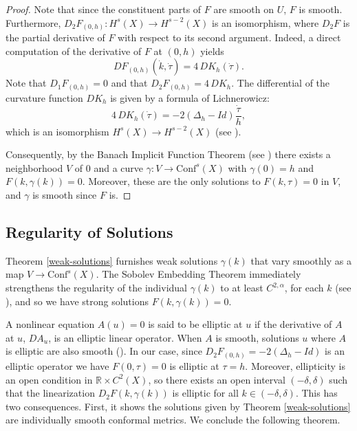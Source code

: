 \documentclass{amsart}
\newcommand{\R}{\mathbb{R}}
\begin{document}
\begin{proof} 
Note that since the constituent parts of $F$ are smooth on $U$, $F$ is smooth. 
Furthermore, $D_2F_{(0,h)} : H^s(X) \to H^{s-2}(X)$ is an isomorphism, where $D_2F$ is the partial derivative of $F$ with respect to its second argument. 
Indeed, a direct computation of the derivative of $F$ at $(0,h)$ yields 
\[
DF_{(0,h)}(\dot{k},\dot{\tau}) = 4 \, D K_h(\dot{\tau}).
\]
Note that $D_1F_{(0,h)} = 0$ and that $D_2F_{(0,h)} = 4 \, DK_h$. 
The differential of the curvature function $D K_h$ is given by a formula of Lichnerowicz: 
\[
 4\, DK_h(\dot{\tau}) = -2(\Delta_h - Id)\frac{\dot{\tau}}{h},
\]
which is an isomorphism $H^s(X) \to H^{s-2}(X)$ (see \cite[Page 33]{tromba1992}).

Consequently, by the Banach Implicit Function Theorem (see \cite[Theorem 17.6]{gilbarg-trudinger2001}) there exists a neighborhood $V$ of $0$ and a curve $\gamma : V \to \mathrm{Conf}^s(X)$ with $\gamma(0) = h$ and $F(k, \gamma(k)) = 0$. 
Moreover, these are the only solutions to $F(k,\tau) = 0$ in $V$, and $\gamma$ is smooth since $F$ is.
\end{proof}



\subsection{Regularity of Solutions}



Theorem \ref{weak-solutions} furnishes weak solutions $\gamma(k)$ that vary smoothly as a map $V \to \mathrm{Conf}^s(X)$. 
The Sobolev Embedding Theorem immediately strengthens the regularity of the individual $\gamma(k)$ to at least $C^{2,\alpha}$, for each $k$ (see \cite{aubin1982}), and so we have strong solutions $F(k,\gamma(k)) = 0$.

 
A nonlinear equation $A(u) = 0$ is said to be elliptic at $u$ if the derivative of $A$ at $u$, $DA_u$, is an elliptic linear operator. 
When $A$ is smooth, solutions $u$ where $A$ is elliptic are also smooth (\cite[Lemma 17.16]{gilbarg-trudinger2001}). 
In our case, since $D_2F_{(0,h)} = -2(\Delta_h - Id)$ is an elliptic operator we have $F(0, \tau) = 0$ is elliptic at $\tau = h$. 
Moreover, ellipticity is an open condition in $\R \times C^2(X)$, so there exists an open interval $(-\delta,\delta)$ such that the linearization $D_2F(k,\gamma(k))$ is elliptic for all $k \in (-\delta,\delta)$.
This has two consequences.
First, it shows the solutions given by Theorem \ref{weak-solutions} are individually smooth conformal metrics.
We conclude the following theorem.
\end{document}
